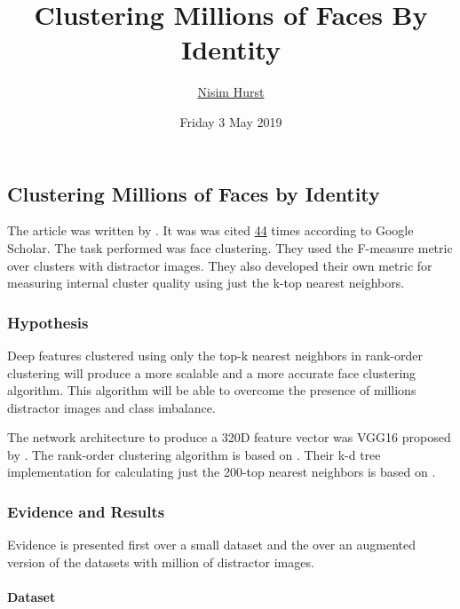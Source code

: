\documentclass[]{article}
\title{Clustering Millions of Faces By Identity}
\author{\href{mailto:langheran@gmail.com}{Nisim Hurst}}
\date{Friday 3 May 2019}
\let\oldparagraph\paragraph
\renewcommand{\paragraph}[1]{\oldparagraph{#1}\mbox{}}
\begin{document}
\maketitle

\label{toc}

\hypertarget{clustering-millions-of-faces-by-identity}{%
\subsection{Clustering Millions of Faces by Identity}\label{clustering-millions-of-faces-by-identity}}

The article was written by \autocite{otto2018}. It was was cited \href{https://scholar.google.com/scholar?cites=9743611198042490448\&as_sdt=2005\&sciodt=0,5\&hl=en}{44} times according to Google Scholar. The task performed was face clustering. They used the F-measure metric over clusters with distractor images. They also developed their own metric for measuring internal cluster quality using just the k-top nearest neighbors.

\hypertarget{hypothesis}{%
\subsubsection{Hypothesis}\label{hypothesis}}

Deep features clustered using only the top-k nearest neighbors in rank-order clustering will produce a more scalable and a more accurate face clustering algorithm. This algorithm will be able to overcome the presence of millions distractor images and class imbalance.

The network architecture to produce a 320D feature vector was VGG16 proposed by \autocite{Simonyan2014}. The rank-order clustering algorithm is based on \autocite{zhu2011}. Their k-d tree implementation for calculating just the 200-top nearest neighbors is based on \autocite{muja2014}.

\hypertarget{evidence-and-results}{%
\subsubsection{Evidence and Results}\label{evidence-and-results}}

Evidence is presented first over a small dataset and the over an augmented version of the datasets with million of distractor images.

\hypertarget{dataset}{%
\paragraph{Dataset}\label{dataset}}
\end{document}
